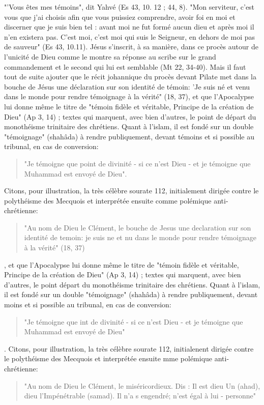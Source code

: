 "'Vous êtes mes témoins", dit Yahvé (Es 43, 10. 12 ; 44, 8). "Mon serviteur, c'est vous que j'ai choisis afin que vous puissiez comprendre, avoir foi en moi et discerner que je suis bien tel : avant moi ne fut formé aucun dieu et après moi il n'en existera pas. C'est moi, c'est moi qui suis le Seigneur, en dehors de moi pas de sauveur" (Es 43, 10.11). Jésus s'inscrit, à sa manière, dans ce procès autour de l'unicité de Dieu comme le montre sa réponse au scribe sur le grand commandement et le second qui lui est semblable (Mt 22, 34-40). Mais il faut tout de suite ajouter que le récit johannique du procès devant Pilate met dans la bouche de Jésus une déclaration sur son identité de témoin: 'Je suis né et venu dans le monde pour rendre témoignage à la vérité" (18, 37), et que l'Apocalypse lui donne même le titre de "témoin fidèle et véritable, Principe de la création de Dieu" (Ap 3, 14) ; textes qui marquent, avec bien d'autres, le point de départ du monothéisme trinitaire des chrétiens. Quant à l'islam, il est fondé sur un double "témoignage" (shahâda) à rendre publiquement, devant témoins et si possible au tribunal, en cas de conversion: \begin{quote}
    "Je témoigne que point de divinité - si ce n'est Dieu - et je témoigne que Muhammad est envoyé de Dieu".
\end{quote}  Citons, pour illustration, la très célèbre sourate 112, initialement dirigée contre le polythéisme des Mecquois et interprétée ensuite comme polémique anti-chrétienne: \begin{quote}
    "Au nom de Dieu le Clément, le bouche de Jesus une declaration sur son identité de temoin: je suis ne et nu dans le monde pour rendre témoignage à la vérité" (18, 37)
\end{quote}, et que l'Apocalypse lui donne même le titre de "témoin fidèle et véritable, Principe de la création de Dieu" (Ap 3, 14) ; textes qui marquent, avec bien d'autres, le point départ du monothéisme trinitaire des chrétiens. Quant à l'islam, il est fondé sur un double "témoignage" (shahâda) à rendre publiquement, devant moins et si possible au tribunal, en cas de conversion: \begin{quote}
    "Je témoigne que int de divinité - si ce n'est Dieu - et je témoigne que Muhammad est envoyé de Dieu"
\end{quote}. Citons, pour illustration, la très célèbre sourate 112, initialenent dirigée contre le polythéisme des Mecquois et interprétée ensuite mme polémique anti-chrétienne:
\begin{quote}
    "Au nom de Dieu le Clément, le miséricordieux. Dis : Il est dieu Un (ahad), dieu l'Impénétrable (samad). Il n'a s engendré; n'est égal à lui - personne"
\end{quote}

